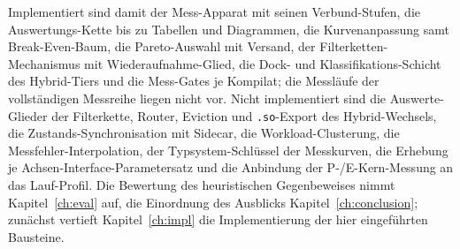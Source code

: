 \begin{nurkurz}
Implementiert sind damit der Mess-Apparat mit seinen Verbund-Stufen, die Auswertungs-Kette bis zu Tabellen und
Diagrammen, die Kurvenanpassung samt Break-Even-Baum, die Pareto-Auswahl mit Versand, der
Filterketten-Mechanismus mit Wiederaufnahme-Glied, die Dock- und Klassifikations-Schicht des Hybrid-Tiers und
die Mess-Gates je Kompilat; die Messläufe der vollständigen Messreihe liegen nicht vor. Nicht implementiert sind
die Auswerte-Glieder der Filterkette, Router, Eviction und \texttt{.so}-Export des Hybrid-Wechsels, die
Zustands-Synchronisation mit Sidecar, die Workload-Clusterung, die Messfehler-Interpolation, der
Typsystem-Schlüssel der Messkurven, die Erhebung je Achsen-Interface-Parametersatz und die Anbindung der
P-/E-Kern-Messung an das Lauf-Profil. Die Bewertung des heuristischen Gegenbeweises nimmt Kapitel~\ref{ch:eval}
auf, die Einordnung des Ausblicks Kapitel~\ref{ch:conclusion}; zunächst vertieft Kapitel~\ref{ch:impl} die
Implementierung der hier eingeführten Bausteine.
\end{nurkurz}

